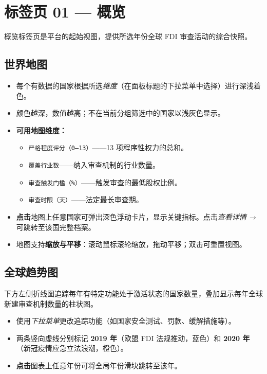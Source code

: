 \documentclass[12pt,a4paper]{article}
\newcommand{\uielem}[1]{\textit{#1}}
\newcommand{\fieldname}[1]{\texttt{\small#1}}
\begin{document}
\section{标签页 01 — 概览}
\label{sec:overview-tab}

概览标签页是平台的起始视图，提供所选年份全球 FDI 审查活动的综合快照。

\subsection{世界地图}

\begin{itemize}
  \item 每个有数据的国家根据所选\uielem{维度}（在面板标题的下拉菜单中选择）进行深浅着色。
  \item 颜色越深，数值越高；不在当前分组筛选中的国家以浅灰色显示。
  \item \textbf{可用地图维度：}
    \begin{itemize}
      \item \fieldname{严格程度评分（0--13）}——13 项程序性权力的总和。
      \item \fieldname{覆盖行业数}——纳入审查机制的行业数量。
      \item \fieldname{审查触发门槛（\%）}——触发审查的最低股权比例。
      \item \fieldname{审查时限（天）}——法定最长审查期。
    \end{itemize}
  \item \textbf{点击}地图上任意国家可弹出深色浮动卡片，显示关键指标。点击\uielem{查看详情 →}可跳转至该国完整档案。
  \item 地图支持\textbf{缩放与平移}：滚动鼠标滚轮缩放，拖动平移；双击可重置视图。
\end{itemize}

\subsection{全球趋势图}

下方左侧折线图追踪每年有特定功能处于激活状态的国家数量，叠加显示每年全球新建审查机制数量的柱状图。

\begin{itemize}
  \item 使用\uielem{下拉菜单}更改追踪功能（如国家安全测试、罚款、缓解措施等）。
  \item 两条竖向虚线分别标记 \textbf{2019 年}（欧盟 FDI 法规推动，蓝色）和 \textbf{2020 年}（新冠疫情应急立法浪潮，橙色）。
  \item \textbf{点击}图表上任意年份可将全局年份滑块跳转至该年。
\end{itemize}
\end{document}
